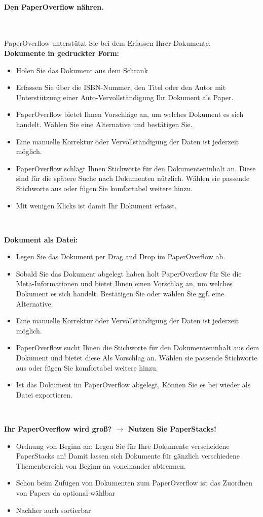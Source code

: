 \documentclass[a4paper,12pt]{article}
\begin{document}
\paragraph{Den PaperOverflow nähren.}\

PaperOverflow unterstützt Sie bei dem Erfassen Ihrer Dokumente. \\

\textbf{Dokumente in gedruckter Form:} 
\begin{itemize}
	\item Holen Sie das Dokument aus dem Schrank
	\item Erfassen Sie über die ISBN-Nummer, den Titel oder den Autor mit Unterstützung einer Auto-Vervollständigung Ihr Dokument als Paper.
	\item PaperOverflow bietet Ihnen Vorschläge an, um welches Dokument es sich handelt. Wählen Sie eine Alternative und bestätigen Sie. 
	\item Eine manuelle Korrektur oder Vervollständigung der Daten ist jederzeit möglich.
	\item PaperOverflow schlägt Ihnen Stichworte für den Dokumenteninhalt an. Diese sind für die spätere Suche nach Dokumenten nützlich. Wählen sie passende Stichworte aus oder fügen Sie komfortabel weitere hinzu.
	\item Mit wenigen Klicks ist damit Ihr Dokument erfasst.
\end{itemize} \

\textbf{Dokument als Datei:}
\begin{itemize}
	\item Legen Sie das Dokument per Drag and Drop im PaperOverflow ab.
	\item Sobald Sie das Dokument abgelegt haben holt PaperOverflow für Sie die Meta-Informationen und bietet Ihnen einen Vorschlag an, um welches Dokument es sich handelt. Bestätigen Sie oder wählen Sie ggf. eine Alternative.
	\item Eine manuelle Korrektur oder Vervollständigung der Daten ist jederzeit möglich.
	\item PaperOverflow sucht Ihnen die Stichworte für den Dokumenteninhalt aus dem Dokument und bietet diese Als Vorschlag an. Wählen sie passende Stichworte aus oder fügen Sie komfortabel weitere hinzu.
	\item Ist das Dokument im PaperOverflow abgelegt, Können Sie es bei wieder als Datei exportieren.
\end{itemize}\ 

\textbf{Ihr PaperOverflow wird groß? $\to$ Nutzen Sie PaperStacks!}
\begin{itemize}
	\item Ordnung von Beginn an: Legen Sie für Ihre Dokumente verscheidene PaperStacks an! Damit lassen sich Dokumente für gänzlich verschiedene Themenbereich von Beginn an voneinander abtrennen.
	\item Schon beim Zufügen von Dokumenten zum PaperOverflow ist das Zuordnen von Papers da optional wählbar
	\item Nachher auch sortierbar
\end{itemize}
\end{document}
